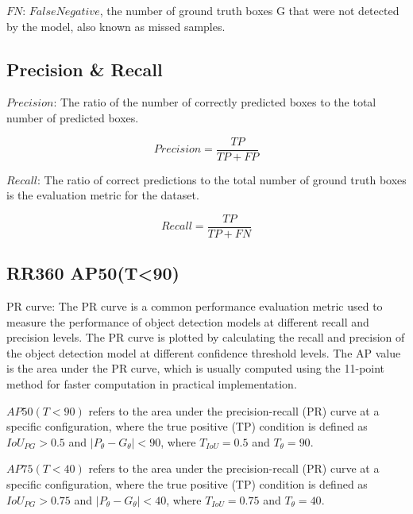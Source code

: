 \documentclass{article}
\begin{document}
$FN$: $False Negative$, the number of ground truth boxes G that were not detected by the model, also known as missed samples.

\subsection{Precision \& Recall}

$Precision$: The ratio of the number of correctly predicted boxes to the total number of predicted boxes.

\begin{equation}
	Precision=\frac{TP}{TP+FP}
 \label{equa:Precision}
\end{equation}

$Recall$: The ratio of correct predictions to the total number of ground truth boxes is the evaluation metric for the dataset.

\begin{equation}
	Recall=\frac{TP}{TP+FN}
 \label{equa:Recall}
\end{equation}



\subsection{RR360 AP50(T<90)}



PR curve: The PR curve is a common performance evaluation metric used to measure the performance of object detection models at different recall and precision levels. The PR curve is plotted by calculating the recall and precision of the object detection model at different confidence threshold levels. The AP value is the area under the PR curve, which is usually computed using the 11-point method for faster computation in practical implementation.



$AP50(T<90)$ refers to the area under the precision-recall (PR) curve at a specific configuration, where the true positive (TP) condition is defined as $IoU_{PG}>0.5$ and $\left|P_{\theta}-G_{\theta}\right|<90$, where $T_{IoU}=0.5$ and $T_{\theta}=90$.

$AP75(T<40)$ refers to the area under the precision-recall (PR) curve at a specific configuration, where the true positive (TP) condition is defined as $IoU_{PG}>0.75$ and $\left|P_{\theta}-G_{\theta}\right|<40$, where $T_{IoU}=0.75$ and $T_{\theta}=40$.
\end{document}
